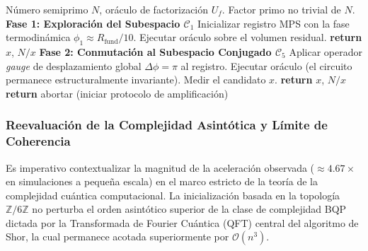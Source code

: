 \documentclass[12pt,a4paper]{article}
\theoremstyle{plain}
\theoremstyle{definition}
\theoremstyle{remark}
\begin{document}
\begin{algorithm}[H]
\caption{Estrategia Adaptativa de Búsqueda Modular (MST)}
\label{alg:estrategia}
\begin{algorithmic}[1]
\Require Número semiprimo $N$, oráculo de factorización $U_f$.
\Ensure Factor primo no trivial de $N$.
\Statex
\State \textbf{Fase 1: Exploración del Subespacio $\mathcal{C}_1$}
\State Inicializar registro MPS con la fase termodinámica $\phi_1 \approx R_{\text{fund}}/10$.
\State Ejecutar oráculo sobre el volumen residual.
    \State \textbf{return} $x$, $N/x$
\EndIf
\Statex
\State \textbf{Fase 2: Conmutación al Subespacio Conjugado $\mathcal{C}_5$}
\State Aplicar operador \textit{gauge} de desplazamiento global $\Delta\phi = \pi$ al registro.
\State Ejecutar oráculo (el circuito permanece estructuralmente invariante).
\State Medir el candidato $x$.
    \State \textbf{return} $x$, $N/x$
\Else
    \State \textbf{return} abortar (iniciar protocolo de amplificación)
\EndIf
\end{algorithmic}
\end{algorithm}

\subsubsection*{Reevaluación de la Complejidad Asintótica y Límite de Coherencia}

Es imperativo contextualizar la magnitud de la aceleración observada ($\approx 4.67\times$ en simulaciones a pequeña escala) en el marco estricto de la teoría de la complejidad cuántica computacional. La inicialización basada en la topología $\mathbb{Z}/6\mathbb{Z}$ no perturba el orden asintótico superior de la clase de complejidad BQP dictada por la Transformada de Fourier Cuántica (QFT) central del algoritmo de Shor, la cual permanece acotada superiormente por $\mathcal{O}(n^3)$.
\end{document}
